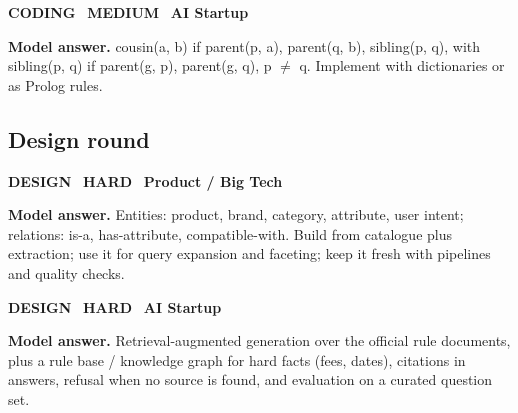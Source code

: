 \documentclass[11pt]{article}
\begin{document}
\begin{tcolorbox}[enhanced,breakable,colback=white,colframe=navyL,arc=2mm,boxrule=0.8pt,left=3mm,right=3mm,
 title={\textbf{QIII.09}\quad Given parent(x, y) facts, write a query for all cousins of a person.},fonttitle=\color{white}\small,colbacktitle=navyL]
\colorbox{navyL!15}{\scriptsize\bfseries\color{navyL} CODING}\
\colorbox{gold!85!black!15}{\scriptsize\bfseries\color{gold!85!black} MEDIUM}\
\colorbox{navy!8}{\scriptsize\bfseries\color{navy} AI Startup}\par\smallskip
\textbf{\color{navy}Model answer.} cousin(a, b) if parent(p, a), parent(q, b), sibling(p, q), with sibling(p, q) if parent(g, p), parent(g, q), p $\ne$ q. Implement with dictionaries or as Prolog rules.
\end{tcolorbox}
\subsection*{\color{crimson}Design round}
\begin{tcolorbox}[enhanced,breakable,colback=white,colframe=crimson,arc=2mm,boxrule=0.8pt,left=3mm,right=3mm,
 title={\textbf{QIII.10}\quad Design a knowledge graph to power product search for an e-commerce site.},fonttitle=\color{white}\small,colbacktitle=crimson]
\colorbox{crimson!15}{\scriptsize\bfseries\color{crimson} DESIGN}\
\colorbox{crimson!15}{\scriptsize\bfseries\color{crimson} HARD}\
\colorbox{navy!8}{\scriptsize\bfseries\color{navy} Product / Big Tech}\par\smallskip
\textbf{\color{navy}Model answer.} Entities: product, brand, category, attribute, user intent; relations: is-a, has-attribute, compatible-with. Build from catalogue plus extraction; use it for query expansion and faceting; keep it fresh with pipelines and quality checks.
\end{tcolorbox}
\begin{tcolorbox}[enhanced,breakable,colback=white,colframe=crimson,arc=2mm,boxrule=0.8pt,left=3mm,right=3mm,
 title={\textbf{QIII.11}\quad How would you reduce hallucinations in an LLM chatbot for university regulations?},fonttitle=\color{white}\small,colbacktitle=crimson]
\colorbox{crimson!15}{\scriptsize\bfseries\color{crimson} DESIGN}\
\colorbox{crimson!15}{\scriptsize\bfseries\color{crimson} HARD}\
\colorbox{navy!8}{\scriptsize\bfseries\color{navy} AI Startup}\par\smallskip
\textbf{\color{navy}Model answer.} Retrieval-augmented generation over the official rule documents, plus a rule base / knowledge graph for hard facts (fees, dates), citations in answers, refusal when no source is found, and evaluation on a curated question set.
\end{tcolorbox}
\end{document}

